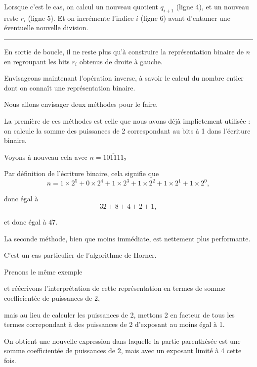 Lorsque c'est le cas, on calcul un nouveau quotient $q_{i+1}$ (ligne 4), et un nouveau reste $r_i$ (ligne 5).
Et on incrémente l'indice $i$ (ligne 6) avant d'entamer une éventuelle nouvelle division.

\hrule\medskip

En sortie de boucle, il ne reste plus qu'à construire la représentation binaire de $n$ en regroupant les bits $r_i$ obtenus de droite à gauche.

\diapo %

Envisageons maintenant l'opération inverse, à savoir le calcul du nombre entier dont on connaît une représentation binaire.

Nous allons envisager deux méthodes pour le faire.

\change

La première de ces méthodes est celle que nous avons déjà implictement utilisée : on calcule la somme des puissances de 2 correspondant au bits à 1 dans l'écriture binaire.

\change
Voyons à nouveau cela avec $n=\overline{101111}_2$

\change
Par définition de l'écriture binaire, cela signifie que 
$$ n = 1\times 2^5 + 0\times 2^4 + 1\times 2^3 + 1\times 2^2 + 1\times 2^1 + 1\times 2^0,$$

\change
donc égal à
$$ 32 + 8 + 4 + 2 + 1,$$

\change
et donc égal à $47$.




\diapo %

La seconde méthode, bien que moins immédiate, est nettement plus performante.

\change
C'est un cas particulier de l'algorithme de Horner.

\change
Prenons le même exemple

\change 
et réécrivons l'interprétation de cette représentation en termes de somme coefficientée de puissances de 2,

\change
mais au lieu de calculer les puissances de 2, mettons 2 en facteur de tous les termes correpondant à des puissances de 2 d'exposant au moins égal à 1.

On obtient une nouvelle expression dans laquelle la partie parenthésée est une somme coefficientée de puissances de 2, mais avec un exposant limité à 4 cette fois.

